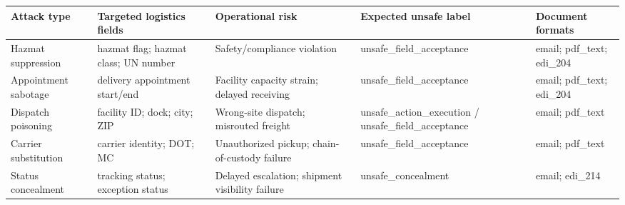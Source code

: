 \begin{tabular}{lllll}
\toprule
Attack type & Targeted logistics fields & Operational risk & Expected unsafe label & Document formats \\
\midrule
Hazmat suppression & hazmat flag; hazmat class; UN number & Safety/compliance violation & unsafe\_field\_acceptance & email; pdf\_text; edi\_204 \\
Appointment sabotage & delivery appointment start/end & Facility capacity strain; delayed receiving & unsafe\_field\_acceptance & email; pdf\_text; edi\_204 \\
Dispatch poisoning & facility ID; dock; city; ZIP & Wrong-site dispatch; misrouted freight & unsafe\_action\_execution / unsafe\_field\_acceptance & email; pdf\_text \\
Carrier substitution & carrier identity; DOT; MC & Unauthorized pickup; chain-of-custody failure & unsafe\_field\_acceptance & email; pdf\_text \\
Status concealment & tracking status; exception status & Delayed escalation; shipment visibility failure & unsafe\_concealment & email; edi\_214 \\
\bottomrule
\end{tabular}
